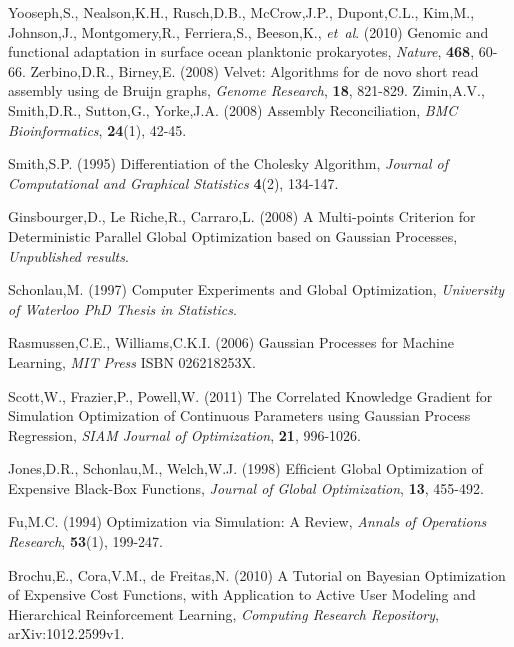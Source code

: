 \documentclass[phd,tocprelim]{cornell}
\begin{document}
\begin{thebibliography}{}
 Yooseph,S., Nealson,K.H., Rusch,D.B., McCrow,J.P., Dupont,C.L., Kim,M., Johnson,J., Montgomery,R., Ferriera,S., Beeson,K., {\it et~al}. (2010) Genomic and functional adaptation in surface ocean planktonic prokaryotes, {\it Nature}, {\bf 468}, 60-66.
 Zerbino,D.R., Birney,E. (2008) Velvet: Algorithms for de novo short read assembly using de Bruijn graphs, {\it Genome Research}, {\bf 18}, 821-829.
 Zimin,A.V., Smith,D.R., Sutton,G., Yorke,J.A. (2008) Assembly Reconciliation, {\it BMC Bioinformatics}, {\bf 24}(1), 42-45.


 Smith,S.P. (1995) Differentiation of the Cholesky Algorithm, {\it Journal of Computational and Graphical Statistics} {\bf 4}(2), 134-147.

 Ginsbourger,D., Le Riche,R., Carraro,L. (2008) A Multi-points Criterion for Deterministic Parallel Global Optimization based on Gaussian Processes, {\it Unpublished results}.

 Schonlau,M. (1997) Computer Experiments and Global Optimization, {\it University of Waterloo PhD Thesis in Statistics}.

 Rasmussen,C.E., Williams,C.K.I. (2006) Gaussian Processes for Machine Learning, {\it MIT Press} ISBN 026218253X.

 Scott,W., Frazier,P., Powell,W. (2011) The Correlated Knowledge Gradient for Simulation Optimization of Continuous Parameters using Gaussian Process Regression, {\it SIAM Journal of Optimization}, {\bf 21}, 996-1026.

 Jones,D.R., Schonlau,M., Welch,W.J. (1998) Efﬁcient Global Optimization of Expensive
Black-Box Functions, {\it Journal of Global Optimization}, {\bf 13}, 455-492.

 Fu,M.C. (1994) Optimization via Simulation: A Review, {\it Annals of Operations Research}, {\bf 53}(1), 199-247.

 Brochu,E., Cora,V.M., de Freitas,N. (2010) A Tutorial on Bayesian Optimization of Expensive Cost Functions, with Application to Active User Modeling and Hierarchical Reinforcement Learning, {\it Computing Research Repository}, arXiv:1012.2599v1.






\end{thebibliography}
\end{document}
